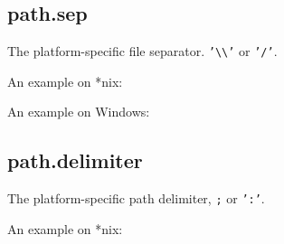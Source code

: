 \subsection{path.sep}\label{path.sep}

The platform-specific file separator.
\texttt{'\textbackslash{}\textbackslash{}'} or \texttt{'/'}.

An example on *nix:

\begin{Shaded}
\begin{Highlighting}[]
\NormalTok{(}\NormalTok{)}
\NormalTok{[}\NormalTok{, }\NormalTok{, }\NormalTok{]}
\end{Highlighting}
\end{Shaded}

An example on Windows:

\begin{Shaded}
\begin{Highlighting}[]
\CharTok{\textbackslash{}\textbackslash{}}\CharTok{\textbackslash{}\textbackslash{}}\NormalTok{(}\NormalTok{)}
\NormalTok{[}\NormalTok{, }\NormalTok{, }\NormalTok{]}
\end{Highlighting}
\end{Shaded}

\subsection{path.delimiter}\label{path.delimiter}

The platform-specific path delimiter, \texttt{;} or \texttt{':'}.

An example on *nix:

\begin{Shaded}
\begin{Highlighting}[]
\NormalTok{(}\NormalTok{)}

\NormalTok{(}\NormalTok{)}
\NormalTok{[}\NormalTok{, }\NormalTok{, }\NormalTok{, }\NormalTok{, }\NormalTok{]}
\end{Highlighting}
\end{Shaded}

